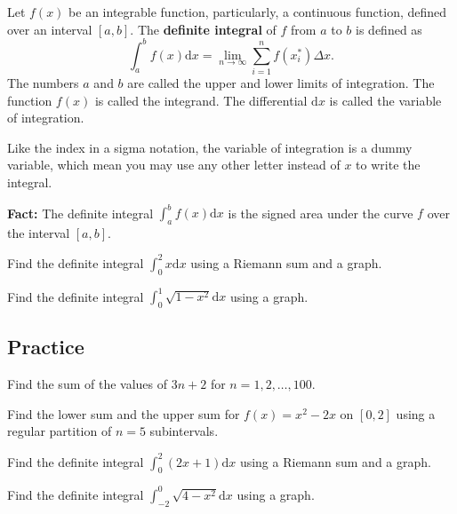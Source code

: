 Let \(f(x)\) be an integrable function, particularly, a continuous
function, defined over an interval \([a,b]\). The \textbf{definite
integral} of \(f\) from \(a\) to \(b\) is defined as
\[\int^b_af(x)\mathrm{d}x=\lim\limits_{n\to\infty}\sum\limits_{i=1}^nf(x^*_i)\Delta x.\]
The numbers \(a\) and \(b\) are called the upper and lower limits of
integration. The function \(f(x)\) is called the integrand. The
differential \(\mathrm{d} x\) is called the variable of integration.

Like the index in a sigma notation, the variable of integration is a
dummy variable, which mean you may use any other letter instead of \(x\)
to write the integral.

\textbf{Fact:} The definite integral \(\int_a^bf(x)\mathrm{d}x\) is the
signed area under the curve \(f\) over the interval \([a, b]\).

\begin{example}

Find the definite integral \(\int_0^2x\mathrm{d}x\) using a Riemann sum
and a graph.

\end{example}
\vspace*{6\baselineskip}

\begin{example}

Find the definite integral \(\int_0^1\sqrt{1-x^2}\mathrm{d}x\) using a
graph.

\end{example}
\vspace*{6\baselineskip}

\subsection{Practice}

\begin{exercise}

Find the sum of the values of \(3n+2\) for \(n=1,2, \dots ,100\).

\end{exercise}
\vspace*{6\baselineskip}

\begin{exercise}

Find the lower sum and the upper sum for \(f(x)=x^2-2x\) on \([0,2]\)
using a regular partition of \(n=5\) subintervals.

\end{exercise}
\vspace*{6\baselineskip}

\begin{exercise}

Find the definite integral \(\int_0^2(2x+1)\mathrm{d}x\) using a Riemann
sum and a graph.

\end{exercise}
\vspace*{6\baselineskip}

\begin{exercise}

Find the definite integral \(\int_{-2}^0\sqrt{4-x^2}\mathrm{d}x\) using
a graph.

\end{exercise}

